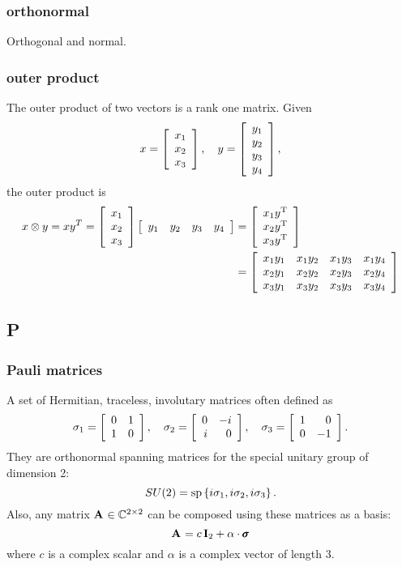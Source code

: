 \subsubsection*{orthonormal}
Orthogonal and normal.

\subsubsection*{outer product}
The outer product of two vectors is a rank one matrix. Given 
\begin{equation}
  x = 
  \mat{c}{
  x_1 \\
  x_2 \\
  x_3
  },
  \quad
  y = 
  \mat{c}{
  y_1 \\
  y_2 \\
  y_3 \\
  y_4
  },
\end{equation}
the outer product is
\begin{equation}
  \begin{split}
x \otimes y = x y^T = 
  \mat{c}{
  x_1 \\
  x_2 \\
  x_3
  }
  \mat{cccc}{
  y_1 & y_2 & y_3 & y_4
  }
  & = 
  \mat{c}{
  x_1 y^{\mathrm{T}}\\
  x_2 y^{\mathrm{T}}\\
  x_3 y^{\mathrm{T}}
  }\\
  &=
  \mat{cccc}{
  x_1 y_1 & x_1 y_2 & x_1 y_3 & x_1 y_4 \\
  x_2 y_1 & x_2 y_2 & x_2 y_3 & x_2 y_4 \\
  x_3 y_1 & x_3 y_2 & x_3 y_3 & x_3 y_4 \\
  } \\
  \end{split}
\end{equation}

\subsection*{P} 

\subsubsection*{Pauli matrices}
A set of Hermitian, traceless, involutary matrices often defined as\begin{equation*}
  \sigma_1 = \paulia, \quad \sigma_2 = \paulib, \quad \sigma_3 = \paulic.	
\end{equation*}
They are orthonormal spanning matrices for the special unitary group of dimension 2: 
$$
SU(2) = \spn \lst{i \sigma_1,i \sigma_2,i \sigma_3}.
$$ 
Also, any matrix $\A{} \in \cmplx{2 \times 2}$ can be composed using these matrices as a basis:
\begin{equation*}
  \A{} = c \, \textbf{I}_2 + \alpha \cdot \pmb{\sigma}
\end{equation*}
where $c$ is a complex scalar and $\alpha$ is a complex vector of length 3.

